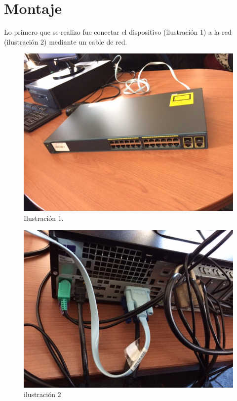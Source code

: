 \documentclass[spanish]{udpreport}
\begin{document}
\section{Montaje}
Lo primero que se realizo fue conectar el dispositivo (ilustración 1) a la red (ilustración 2) mediante un cable de red.
\\[0.2cm]
\begin{figure}[h]
    \centering
    \includegraphics[scale=0.5]{images/a1a1.png}
    \caption{Ilustración 1.}
    \label{fig:my_label}
\end{figure}
\newpage
\begin{figure}[h]
    \centering
    \includegraphics[scale=0.5]{images/a2a2.png}
    \caption{ilustración 2}
    \label{fig:my_label}
\end{figure}
\end{document}
